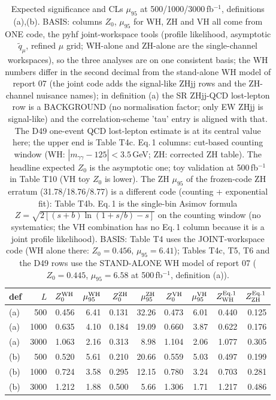 \begin{table}[ht]\centering\small
\begin{tabular}{lrrrrrrrrr}\hline
def & $L$ & $Z_0^{\rm WH}$ & $\mu_{95}^{\rm WH}$ & $Z_0^{\rm ZH}$ & $\mu_{95}^{\rm ZH}$ & $Z_0^{\rm VH}$ & $\mu_{95}^{\rm VH}$ & $Z^{\rm Eq.1}_{\rm WH}$ & $Z^{\rm Eq.1}_{\rm ZH}$ \\\hline
(a) & 500 & 0.456 & 6.41 & 0.131 & 32.26 & 0.473 & 6.01 & 0.440 & 0.125 \\
(a) & 1000 & 0.635 & 4.10 & 0.184 & 19.09 & 0.660 & 3.87 & 0.622 & 0.176 \\
(a) & 3000 & 1.063 & 2.16 & 0.313 & 8.98 & 1.104 & 2.06 & 1.077 & 0.305 \\
(b) & 500 & 0.520 & 5.61 & 0.210 & 20.66 & 0.559 & 5.03 & 0.497 & 0.199 \\
(b) & 1000 & 0.724 & 3.58 & 0.295 & 12.15 & 0.780 & 3.24 & 0.703 & 0.281 \\
(b) & 3000 & 1.212 & 1.88 & 0.500 & 5.66 & 1.306 & 1.71 & 1.217 & 0.486 \\\hline
\end{tabular}
\caption{Expected significance and CLs $\mu_{95}$ at 500/1000/3000\,fb$^{-1}$, definitions (a),(b). BASIS: columns $Z_0$, $\mu_{95}$ for WH, ZH and VH all come from ONE code, the pyhf joint-workspace tools (profile likelihood, asymptotic $\tilde q_\mu$, refined $\mu$ grid; WH-alone and ZH-alone are the single-channel workspaces), so the three analyses are on one consistent basis; the WH numbers differ in the second decimal from the stand-alone WH model of report 07 (the joint code adds the signal-like ZHjj rows and the ZH-channel nuisance names); in definition (a) the SR ZHjj-QCD lost-lepton row is a BACKGROUND (no normalisation factor; only EW ZHjj is signal-like) and the correlation-scheme 'tau' entry is aligned with that. The D49 one-event QCD lost-lepton estimate is at its central value here; the upper end is Table T4c. Eq.\,1 columns: cut-based counting window (WH: $|m_{\gamma\gamma}-125|<3.5$\,GeV; ZH: corrected ZH table). The headline expected $Z_0$ is the asymptotic one; toy validation at 500\,fb$^{-1}$ in Table T10 (VH toy $Z_0$ is lower). The ZH $\mu_{95}$ of the frozen-code ZH erratum (31.78/18.76/8.77) is a different code (counting + exponential fit): Table T4b. Eq.\,1 is the single-bin Asimov formula $Z=\sqrt{2[(s+b)\ln(1+s/b)-s]}$ on the counting window (no systematics; the VH combination has no Eq.\,1 column because it is a joint profile likelihood). BASIS: Table T4 uses the JOINT-workspace code (WH alone there: $Z_0=0.456$, $\mu_{95}=6.41$); Tables T4c, T5, T6 and the D49 rows use the STAND-ALONE WH model of report 07 ($Z_0=0.445$, $\mu_{95}=6.58$ at 500\,fb$^{-1}$, definition (a)).}
\end{table}

